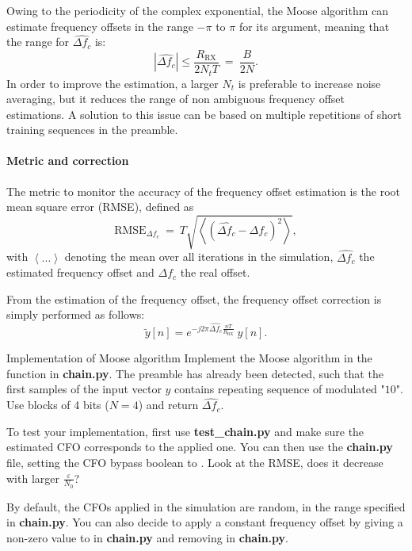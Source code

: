 Owing to the periodicity of the complex exponential, the Moose algorithm can estimate frequency offsets in the range $-\pi$ to $\pi$ for its argument, meaning that the range for $\widehat{\Delta f_c}$ is:
\begin{equation*}
    |\widehat{\Delta f_c}| \leq \frac{R_{\text{RX}}}{2N_tT}\:=\:\frac{B}{2N}.
\end{equation*}
In order to improve the estimation, a larger $N_t$ is preferable to increase noise averaging, but it reduces the range of non ambiguous frequency offset estimations. A solution to this issue can be based on multiple repetitions of short training sequences in the preamble.

\paragraph{Metric and correction}
The metric to monitor the accuracy of the frequency offset estimation is the root mean square error (RMSE), defined as
\begin{equation*}
    \text{RMSE}_{\Delta f_c}\:=\:T\sqrt{\left\langle\left(\widehat{\Delta f_c}-\Delta f_c\right)^2\right\rangle},
\end{equation*}
with $\left\langle ... \right\rangle$ denoting the mean over all iterations in the simulation, $\widehat{\Delta f_c}$ the estimated frequency offset and $\Delta f_c$ the real offset.

From the estimation of the frequency offset, the frequency offset correction is simply performed as follows:
\begin{equation*}
    \tilde{y}[n] = e^{-j2\pi \widehat{\Delta f_c} \frac{nT}{R_{\text{RX}}}}\:y[n].
\end{equation*}


\begin{bclogo}[couleur = gray!20, arrondi = 0.2, logo=\bccrayon]{Implementation of Moose algorithm}
Implement the Moose algorithm in the  function in \textbf{chain.py}. The preamble has already been detected, such that the first samples of the input vector $y$ contains repeating sequence of modulated "$10$". Use blocks of 4 bits ($N=4$) and return $\widehat{\Delta f_c}$.

To test your implementation, first use \textbf{test\_chain.py} and make sure the estimated CFO corresponds to the applied one. You can then use the \textbf{chain.py} file, setting the CFO bypass boolean to . Look at the RMSE, does it decrease with larger $\frac{\varepsilon}{N_0}$?

By default, the CFOs applied in the simulation are random, in the range specified in \textbf{chain.py}. You can also decide to apply a constant frequency offset by giving a non-zero value to  in \textbf{chain.py} and removing  in \textbf{chain.py}.
\end{bclogo}



